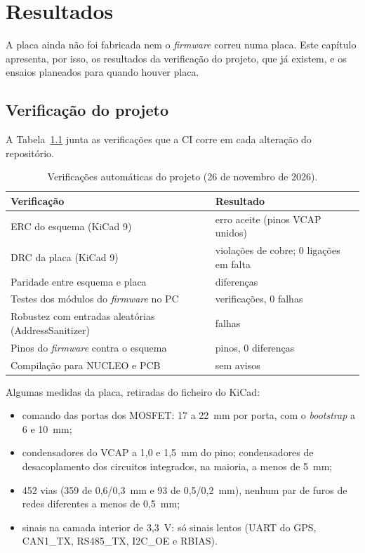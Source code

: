 \chapter{Resultados}
\label{cap:resultados}

A placa ainda não foi fabricada nem o \textit{firmware} correu numa placa.
Este capítulo apresenta, por isso, os resultados da verificação do projeto,
que já existem, e os ensaios planeados para quando houver placa.

\section{Verificação do projeto}

A Tabela~\ref{tab:res-verificacao} junta as verificações que a CI corre em
cada alteração do repositório.

\begin{table}[htbp]
\centering\small{}
\renewcommand{\arraystretch}{1.15}
\caption{Verificações automáticas do projeto (26 de novembro de 2026).}
\label{tab:res-verificacao}
\begin{tabularx}{\textwidth}{@{}>{\raggedright\arraybackslash}X>{\raggedright\arraybackslash}p{}@{}}
\toprule
\rowcolor{LasetTint}
Verificação & Resultado \\
\midrule
ERC do esquema (KiCad 9) & 1 erro aceite (pinos VCAP unidos) \\
DRC da placa (KiCad 9) & 0 violações de cobre; 0 ligações em falta \\
Paridade entre esquema e placa & 0 diferenças \\
Testes dos módulos do \textit{firmware} no PC & 101 verificações, 0 falhas \\
Robustez com entradas aleatórias (AddressSanitizer) & 0 falhas \\
Pinos do \textit{firmware} contra o esquema & 35 pinos, 0 diferenças \\
Compilação para NUCLEO e PCB & sem avisos \\
\bottomrule
\end{tabularx}
\end{table}

Algumas medidas da placa, retiradas do ficheiro do KiCad:

\begin{itemize}
  \item comando das portas dos MOSFET: 17 a 22~mm por porta, com o
        \textit{bootstrap} a 6 e 10~mm;
  \item condensadores do VCAP a 1,0 e 1,5~mm do pino; condensadores de
        desacoplamento dos circuitos integrados, na maioria, a menos de 5~mm;
  \item 452 vias (359 de 0,6/0,3~mm e 93 de 0,5/0,2~mm), nenhum par de furos
        de redes diferentes a menos de 0,5~mm;
  \item sinais na camada interior de 3,3~V: só sinais lentos (UART do GPS,
        CAN1\_TX, RS485\_TX, I2C\_OE e RBIAS).
\end{itemize}

